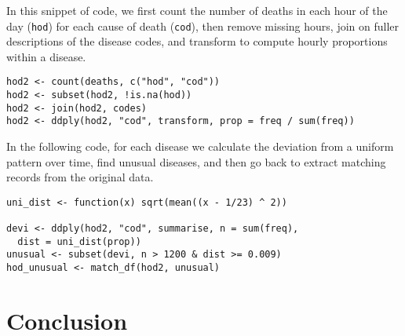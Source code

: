 \documentclass[oneside]{article}
\begin{document}
In this snippet of code, we first count the number of deaths in each hour of the day ({\tt hod}) for each cause of death ({\tt cod}), then remove missing hours, join on fuller descriptions of the disease codes, and transform to compute hourly proportions within a disease.

\begin{verbatim}
hod2 <- count(deaths, c("hod", "cod"))
hod2 <- subset(hod2, !is.na(hod))
hod2 <- join(hod2, codes)
hod2 <- ddply(hod2, "cod", transform, prop = freq / sum(freq))
\end{verbatim}

In the following code, for each disease we calculate the deviation from a uniform pattern over time, find unusual diseases, and then go back to extract matching records from the original data.

\begin{verbatim}
uni_dist <- function(x) sqrt(mean((x - 1/23) ^ 2))

devi <- ddply(hod2, "cod", summarise, n = sum(freq), 
  dist = uni_dist(prop))
unusual <- subset(devi, n > 1200 & dist >= 0.009)
hod_unusual <- match_df(hod2, unusual)
\end{verbatim}

\section{Conclusion}


\end{document}

